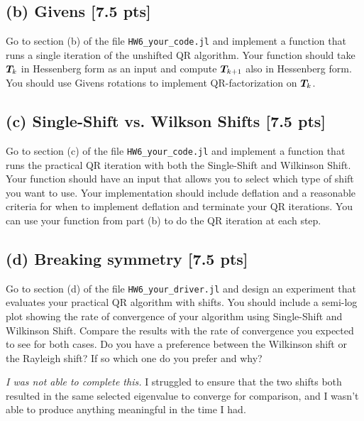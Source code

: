 \documentclass[twoside,10pt]{article}
\begin{document}
\subsection*{(b) Givens [7.5 pts]} 
Go to section (b) of the file \texttt{HW6\_your\_code.jl} and implement a function that runs a single iteration of the unshifted QR algorithm. Your function should take $\bm{T}_{k}$ in Hessenberg form as an input and compute $\bm{T}_{k+1}$ also in Hessenberg form. You should use Givens rotations to implement QR-factorization on $\bm{T}_{k}$.

\subsection*{(c) Single-Shift vs. Wilkson Shifts [7.5 pts]}
Go to section (c) of the file \texttt{HW6\_your\_code.jl} and implement a function that runs the practical QR iteration with both the Single-Shift and Wilkinson Shift. Your function should have an input that allows you to select which type of shift you want to use.  Your implementation should include deflation and a reasonable criteria for when to implement deflation and terminate your QR iterations. You can use your function from part (b) to do the QR iteration at each step.

\subsection*{(d) Breaking symmetry [7.5 pts]}
Go to section (d) of the file \texttt{HW6\_your\_driver.jl} and design an experiment that evaluates your practical QR algorithm with shifts. You should include a semi-log plot showing the rate of convergence of your algorithm using Single-Shift and Wilkinson Shift. Compare the results with the rate of convergence you expected to see for both cases. Do you have a preference between the Wilkinson shift or the Rayleigh shift?  If so which one do you prefer and why?

\quad \textit{I was not able to complete this.} I struggled to ensure that the two shifts both resulted in the same selected eigenvalue to converge for comparison, and I wasn't able to produce anything meaningful in the time I had.
\end{document}
